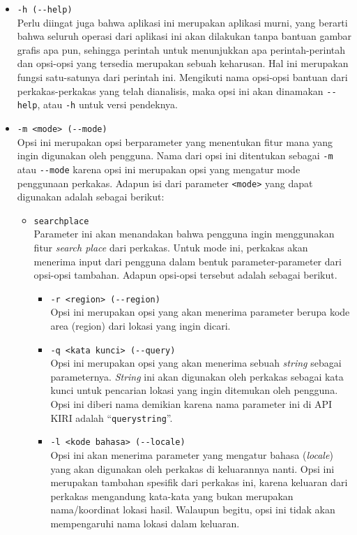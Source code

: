 \begin{itemize}
	\item \verb|-h (--help)|\\
	Perlu diingat juga bahwa aplikasi ini merupakan aplikasi \cl\xspace murni, yang berarti bahwa seluruh operasi dari aplikasi ini akan dilakukan tanpa bantuan gambar grafis apa pun, sehingga perintah untuk menunjukkan apa perintah-perintah dan opsi-opsi yang tersedia merupakan sebuah keharusan. Hal ini merupakan fungsi satu-satunya dari perintah ini. Mengikuti nama opsi-opsi bantuan dari perkakas-perkakas yang telah dianalisis, maka opsi ini akan dinamakan \verb|--help|, atau \verb|-h| untuk versi pendeknya.
	
	\item \verb|-m <mode> (--mode)|\\
	Opsi ini merupakan opsi berparameter yang menentukan fitur mana yang ingin digunakan oleh pengguna. Nama dari opsi ini ditentukan sebagai \verb|-m| atau \verb|--mode| karena opsi ini merupakan opsi yang mengatur mode penggunaan perkakas. Adapun isi dari parameter \verb|<mode>| yang dapat digunakan adalah sebagai berikut:
	
	\begin{itemize}	
		\item \verb|searchplace|\\
		Parameter ini akan menandakan bahwa pengguna ingin menggunakan fitur \textit{search place} dari perkakas. Untuk mode ini, perkakas akan menerima input dari pengguna dalam bentuk parameter-parameter dari opsi-opsi tambahan. Adapun opsi-opsi tersebut adalah sebagai berikut.
			
		\begin{itemize}
			\item \verb|-r <region> (--region)|\\
			Opsi ini merupakan opsi yang akan menerima parameter berupa kode area (region) dari lokasi yang ingin dicari.
			\item \verb|-q <kata kunci> (--query)|\\
			Opsi ini merupakan opsi yang akan menerima sebuah \textit{string} sebagai parameternya. \textit{String} ini akan digunakan oleh perkakas sebagai kata kunci untuk pencarian lokasi yang ingin ditemukan oleh pengguna. Opsi ini diberi nama demikian karena nama parameter ini di API KIRI adalah ``\verb|querystring|''.
			\item \verb|-l <kode bahasa> (--locale)|\\
			Opsi ini akan menerima parameter yang mengatur bahasa (\textit{locale}) yang akan digunakan oleh perkakas di keluarannya nanti. Opsi ini merupakan tambahan spesifik dari perkakas ini, karena keluaran dari perkakas mengandung kata-kata yang bukan merupakan nama/koordinat lokasi hasil. Walaupun begitu, opsi ini tidak akan mempengaruhi nama lokasi dalam keluaran.
		\end{itemize}


\end{itemize}
\end{itemize}

